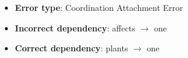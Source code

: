 {\color{red}
\begin{itemize}
    \item \textbf{Error type}: Coordination Attachment Error
    \item \textbf{Incorrect dependency}: affects $\rightarrow$ one
    \item \textbf{Correct dependency}: plants $\rightarrow$ one
\end{itemize}
}